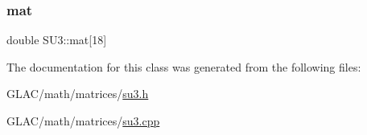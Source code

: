\subsubsection{\texorpdfstring{mat}{mat}}
{\footnotesize\ttfamily double S\+U3\+::mat\mbox{[}18\mbox{]}}



The documentation for this class was generated from the following files\+:\begin{DoxyCompactItemize}
\item 
G\+L\+A\+C/math/matrices/\mbox{\hyperlink{su3_8h}{su3.\+h}}\item 
G\+L\+A\+C/math/matrices/\mbox{\hyperlink{su3_8cpp}{su3.\+cpp}}\end{DoxyCompactItemize}
